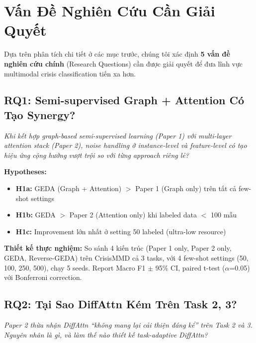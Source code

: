 \documentclass[12pt,a4paper]{article}
\begin{document}
\section{Vấn Đề Nghiên Cứu Cần Giải Quyết}

Dựa trên phân tích chi tiết ở các mục trước, chúng tôi xác định \textbf{5 vấn đề nghiên cứu chính} (Research Questions) cần được giải quyết để đưa lĩnh vực multimodal crisis classification tiến xa hơn.

\subsection{RQ1: Semi-supervised Graph + Attention Có Tạo Synergy?}

\begin{noveltybox}
\textit{Khi kết hợp graph-based semi-supervised learning (Paper 1) với multi-layer attention stack (Paper 2), noise handling ở instance-level và feature-level có tạo hiệu ứng cộng hưởng vượt trội so với từng approach riêng lẻ?}
\end{noveltybox}

\textbf{Hypotheses:}
\begin{itemize}
  \item \textbf{H1a:} GEDA (Graph + Attention) $>$ Paper 1 (Graph only) trên tất cả few-shot settings
  \item \textbf{H1b:} GEDA $>$ Paper 2 (Attention only) khi labeled data $<$ 100 mẫu
  \item \textbf{H1c:} Improvement lớn nhất ở setting 50 labeled (ultra-low resource)
\end{itemize}

\textbf{Thiết kế thực nghiệm:} So sánh 4 kiến trúc (Paper 1 only, Paper 2 only, GEDA, Reverse-GEDA) trên CrisisMMD cả 3 tasks, với 4 few-shot settings (50, 100, 250, 500), chạy 5 seeds. Report Macro F1 $\pm$ 95\% CI, paired t-test ($\alpha$=0.05) với Bonferroni correction.

\subsection{RQ2: Tại Sao DiffAttn Kém Trên Task 2, 3?}

\begin{noveltybox}
\textit{Paper 2 thừa nhận DiffAttn ``không mang lại cải thiện đáng kể'' trên Task 2 và 3. Nguyên nhân là gì, và làm thế nào thiết kế task-adaptive DiffAttn?}
\end{noveltybox}
\end{document}
